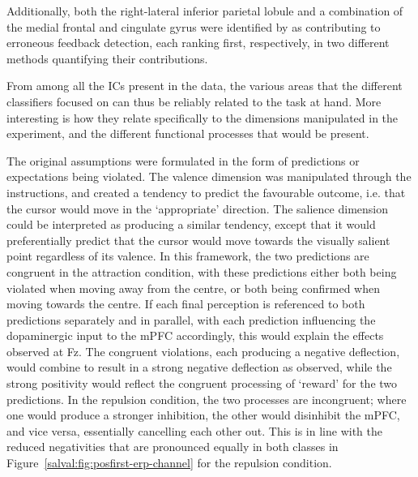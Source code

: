 Additionally, both the right-lateral inferior parietal lobule and a combination of the medial frontal and cingulate gyrus were identified by  as contributing to erroneous feedback detection, each ranking first, respectively, in two different methods quantifying their contributions. 

From among all the ICs present in the data, the various areas that the different classifiers focused on can thus be reliably related to the task at hand. More interesting is how they relate specifically to the dimensions manipulated in the experiment, and the different functional processes that would be present.

The original assumptions were formulated in the form of predictions or expectations being violated. The valence dimension was manipulated through the instructions, and created a tendency to predict the favourable outcome, i.e. that the cursor would move in the `appropriate' direction. The salience dimension could be interpreted as producing a similar tendency, except that it would preferentially predict that the cursor would move towards the visually salient point regardless of its valence. In this framework, the two predictions are congruent in the attraction condition, with these predictions either both being violated when moving away from the centre, or both being confirmed when moving towards the centre. If each final perception is referenced to both predictions separately and in parallel, with each prediction influencing the dopaminergic input to the mPFC accordingly, this would explain the effects observed at Fz. The congruent violations, each producing a negative deflection, would combine to result in a strong negative deflection as observed, while the strong positivity would reflect the congruent processing of `reward' for the two predictions. In the repulsion condition, the two processes are incongruent; where one would produce a stronger inhibition, the other would disinhibit the mPFC, and vice versa, essentially cancelling each other out. This is in line with the reduced negativities that are pronounced equally in both classes in Figure~\ref{salval:fig:posfirst-erp-channel} for the repulsion condition. 

